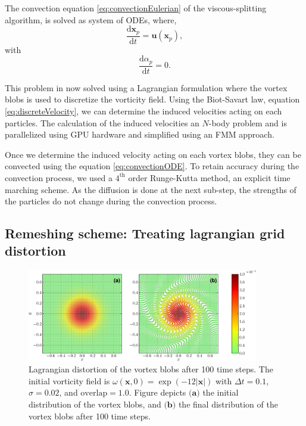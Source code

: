 The convection equation \ref{eq:convectionEulerian} of the viscous-splitting algorithm, is solved as system of ODEs, where,
	\begin{equation}
	\frac{\mathrm{d}\mathbf{x}_p}{\mathrm{d}t} = \mathbf{u}\left(\mathbf{x}_p\right),
	\label{eq:convectionODE}
	\end{equation}
with
	\begin{equation}
	\frac{\mathrm{d}\alpha_p}{\mathrm{d}t} = 0.
	\label{eq:conservationODE}
	\end{equation}

This problem in now solved using a Lagrangian formulation where the vortex blobs is used to discretize the vorticity field. Using the Biot-Savart law, equation \ref{eq:discreteVelocity}, we can determine the induced velocities acting on each particles. The calculation of the induced velocities an $N$-body problem and is parallelized using GPU hardware and simplified using an FMM approach.

Once we determine the induced velocity acting on each vortex blobs, they can be convected using the equation \ref{eq:convectionODE}. To retain accuracy during the convection process, we used a $4^{\mathrm{th}}$ order Runge-Kutta method, an explicit time marching scheme. As the diffusion is done at the next sub-step, the strengths of the particles do not change during the convection process.

\subsection{Remeshing scheme: Treating lagrangian grid distortion}
\label{subsec:remeshing}

	\begin{figure}[t]
	\centering
	\includegraphics[width=0.9\textwidth]{figures/lagrangian/distortion-crop.pdf}
    \caption{Lagrangian distortion of the vortex blobs after 100 time steps. The initial vorticity field is $\omega\left(\mathbf{x},0\right) = \exp\left(-12\left|\mathbf{x}\right|\right)$ with $\Delta t = 0.1$, $\sigma=0.02$, and $\mathrm{overlap} = 1.0$. Figure depicts $\textbf{(a)}$ the initial distribution of the vortex blobs, and $\textbf{(b)}$ the final distribution of the vortex blobs after 100 time steps.}
    \label{fig:distortion}
	\end{figure}

